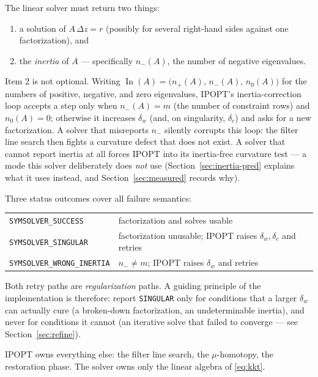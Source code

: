 \documentclass[11pt]{article}
\newcommand{\In}{\operatorname{In}}
\newcommand{\code}[1]{\texttt{#1}}
\begin{document}
The linear solver must return two things:
\begin{enumerate}
\item a solution of $A\,\Delta z = r$ (possibly for several right-hand
      sides against one factorization), and
\item the \emph{inertia} of $A$ --- specifically $n_-(A)$, the number of
      negative eigenvalues.
\end{enumerate}
Item 2 is not optional.  Writing
$\In(A) = \bigl(n_+(A),\,n_-(A),\,n_0(A)\bigr)$
for the numbers of positive, negative, and zero eigenvalues, IPOPT's
inertia-correction loop accepts a step only when
$n_-(A) = m$ (the number of constraint rows) and $n_0(A)=0$; otherwise it
increases $\delta_w$ (and, on singularity, $\delta_c$) and asks for a new
factorization.  A solver that misreports $n_-$ silently corrupts this loop:
the filter line search then fights a curvature defect that does not exist.
A solver that cannot report inertia at all forces IPOPT into its inertia-free
curvature test \cite{chiang2016inertia} --- a mode this solver deliberately
does \emph{not} use (Section~\ref{sec:inertia-pred} explains what it uses
instead, and Section~\ref{sec:measured} records why).

Three status outcomes cover all failure semantics:
\begin{center}
\begin{tabular}{ll}
\toprule
\code{SYMSOLVER\_SUCCESS} & factorization and solves usable\\
\code{SYMSOLVER\_SINGULAR} & factorization unusable; IPOPT raises
  $\delta_w,\delta_c$ and retries\\
\code{SYMSOLVER\_WRONG\_INERTIA} & $n_-\ne m$; IPOPT raises $\delta_w$
  and retries\\
\bottomrule
\end{tabular}
\end{center}
Both retry paths are \emph{regularization} paths.  A guiding principle of the
implementation is therefore: report \code{SINGULAR} only for conditions that a
larger $\delta_w$ can actually cure (a broken-down factorization, an
undeterminable inertia), and never for conditions it cannot (an iterative
solve that failed to converge --- see Section~\ref{sec:refine}).

IPOPT owns everything else: the filter line search, the $\mu$-homotopy, the
restoration phase.  The solver owns only the linear algebra of
\eqref{eq:kkt}.

\end{document}
